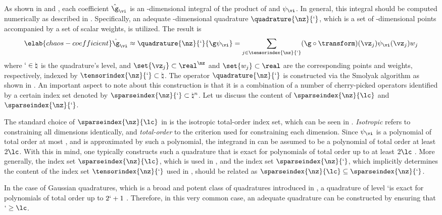 As shown in  and , each
coefficient $\hat{\g}_{\vi}$ is an \nz-dimensional integral of the product of \g
and $\psi_{\vi}$. In general, this integral should be computed numerically as
described in . Specifically, an adequate
\nz-dimensional quadrature $\quadrature{\nz}{\lq}$, which is a set of
\nz-dimensional points accompanied by a set of scalar weights, is utilized. The
result is
\begin{equation} \elab{chaos-coefficient}
  \hat{\g}_{\vi} \approx \quadrature{\nz}{\lq}{\g \psi_{\vi}}
  = \sum_{j \in \tensorindex{\nz}{\lq}} (\g \circ \transform)(\vz_j) \psi_{\vi}(\vz_j) w_j
\end{equation}
where $\lq \in \natural$ is the quadrature's level, and $\set{\vz_j} \subset
\real^\nz$ and $\set{w_j} \subset \real$ are the corresponding points and
weights, respectively, indexed by $\tensorindex{\nz}{\lq} \subset \natural$. The
operator $\quadrature{\nz}{\lq}$ is constructed via the Smolyak algorithm
\cite{smolyak1963} as shown in . An important aspect to
note about this construction is that it is a combination of a number of
cherry-picked operators identified by a certain index set denoted by
$\sparseindex{\nz}{\lq} \subset \natural^n$. Let us discuss the content of
$\sparseindex{\nz}{\lc}$ and $\sparseindex{\nz}{\lq}$.

The standard choice of $\sparseindex{\nz}{\lc}$ in  is the
isotropic total-order index set, which can be seen in
. \emph{Isotropic} refers to constraining all
dimensions identically, and \emph{total-order} to the criterion used for
constraining each dimension. Since $\psi_{\vi}$ is a polynomial of total order
at most \lc, and \g is approximated by such a polynomial, the integrand in
 can be assumed to be a polynomial of total order at
least $2 \lc$. With this in mind, one typically constructs such a quadrature
that is exact for polynomials of total order up to at least $2 \lc$
\cite{eldred2008}. More generally, the index set $\sparseindex{\nz}{\lc}$, which
is used in , and the index set $\sparseindex{\nz}{\lq}$,
which implicitly determines the content of the index set
$\tensorindex{\nz}{\lq}$ used in , should be related as
$\sparseindex{\nz}{\lc} \subseteq \sparseindex{\nz}{\lq}$.

In the case of Gaussian quadratures, which is a broad and potent class of
quadratures introduced in , a quadrature of level
\lq is exact for polynomials of total order up to $2 \lq + 1$ \cite{heiss2008}.
Therefore, in this very common case, an adequate quadrature can be constructed
by ensuring that $\lq \geq \lc$.

